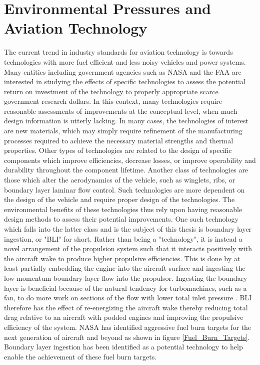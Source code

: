 \documentclass[12pt]{gatech-thesis}
\begin{document}
\section{Environmental Pressures and Aviation Technology}
\indent The current trend in industry standards for aviation technology is towards technologies with more fuel efficient and less noisy vehicles and power systems. Many entities including government agencies such as NASA and the FAA are interested in studying the effects of specific technologies to assess the potential return on investment of the technology to properly appropriate scarce government research dollars. In this context, many technologies require reasonable assessments of improvements at the conceptual level, when much design information is utterly lacking.  In many cases, the technologies of interest are new materials, which may simply require refinement of the manufacturing processes required to achieve the necessary material strengths and thermal properties. Other types of technologies are related to the design of specific components which improve efficiencies, decrease losses, or improve operability and durability throughout the component lifetime. Another class of technologies are those which alter the aerodynamics of the vehicle, such as winglets, ribs, or boundary layer laminar flow control. Such technologies are more dependent on the design of the vehicle and require proper design of the technologies. The environmental benefits of these technologies thus rely upon having reasonable design methods to assess their potential improvements.  One such technology which falls into the latter class and is the subject of this thesis is boundary layer ingestion, or "BLI" for short. Rather than being a "technology", it is instead a novel arrangement of the propulsion system such that it interacts positively with the aircraft wake to produce higher propulsive efficiencies. This is done by at least partially embedding the engine into the aircraft surface and ingesting the low-momentum boundary layer flow into the propulsor. Ingesting the boundary layer is beneficial because of the natural tendency for turbomachines, such as a fan, to do more work on sections of the flow with lower total inlet pressure \cite{Smith1993}.  BLI therefore has the effect of re-energizing the aircraft wake thereby reducing total drag relative to an aircraft with podded engines and improving the propulsive efficiency of the system.  NASA has identified aggressive fuel burn targets for the next generation of aircraft and beyond as shown in figure \ref{Fuel_Burn_Targets}.  Boundary layer ingestion has been identified as a potential technology to help enable the achievement of these fuel burn targets.  
\end{document}
